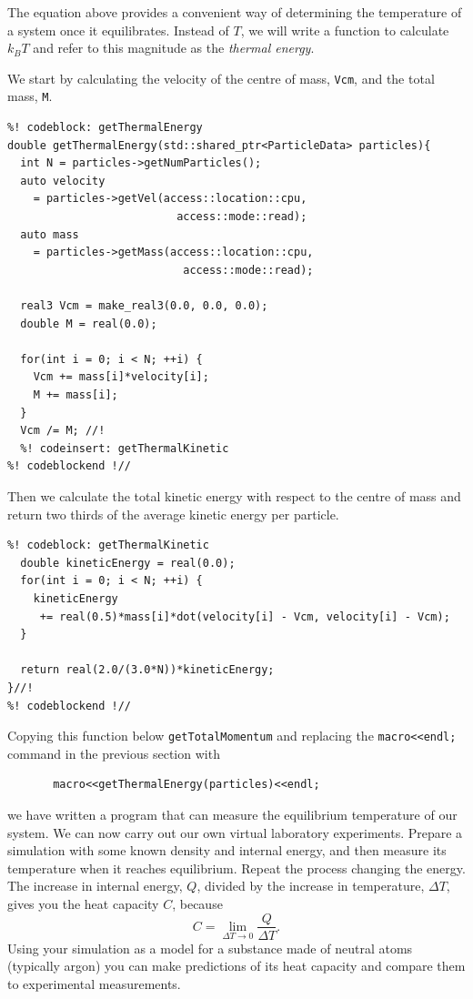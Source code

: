 The equation above provides a convenient way of determining the temperature of a 
system once it equilibrates. Instead of $T$, we will write a function to 
calculate $k_BT$ and refer to this magnitude as the \textit{thermal energy}.

We start by calculating the velocity of the centre of mass, \texttt{Vcm}, and 
the total mass, \texttt{M}.
\begin{lstlisting}
%! codeblock: getThermalEnergy
double getThermalEnergy(std::shared_ptr<ParticleData> particles){
  int N = particles->getNumParticles();
  auto velocity
    = particles->getVel(access::location::cpu,
                          access::mode::read);
  auto mass
    = particles->getMass(access::location::cpu,
                           access::mode::read);

  real3 Vcm = make_real3(0.0, 0.0, 0.0);
  double M = real(0.0);

  for(int i = 0; i < N; ++i) {
    Vcm += mass[i]*velocity[i];
    M += mass[i];
  }
  Vcm /= M; //!
  %! codeinsert: getThermalKinetic
%! codeblockend !//
\end{lstlisting}
Then we calculate the total kinetic energy with respect to the centre of mass 
and return two thirds of the average kinetic energy per particle.
\begin{lstlisting}
%! codeblock: getThermalKinetic
  double kineticEnergy = real(0.0);
  for(int i = 0; i < N; ++i) {
    kineticEnergy
     += real(0.5)*mass[i]*dot(velocity[i] - Vcm, velocity[i] - Vcm);
  }

  return real(2.0/(3.0*N))*kineticEnergy;
}//!
%! codeblockend !//
\end{lstlisting}
Copying this function below \texttt{getTotalMomentum} and replacing the 
\texttt{macro<<endl;} command in the previous section with
\begin{lstlisting}
       macro<<getThermalEnergy(particles)<<endl;
\end{lstlisting}
we have written a program that can measure the equilibrium temperature of our 
system. We can now carry out our own virtual laboratory experiments. Prepare a 
simulation with some known density and internal energy, and then measure its 
temperature when it reaches equilibrium. Repeat the process changing the energy. 
The increase in internal energy, $Q$, divided by the increase in temperature, 
$\Delta T$, gives you the heat capacity $C$, because
\begin{equation*}
  C = \lim_{\Delta T \to 0} \frac{Q}{\Delta T}.
\end{equation*}
Using your simulation as a model for a substance made of neutral atoms 
(typically argon) you can make predictions of its heat capacity and compare them 
to experimental measurements.

